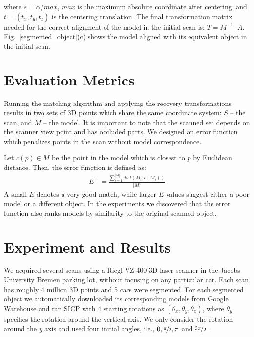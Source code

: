 \documentclass{llncs}
\begin{document}
where $s = \alpha / max$, $max$ is the maximum absolute coordinate after centering, and $t = (t_x, t_y, t_z)$ is the centering translation. The final transformation matrix needed for the correct alignment of the model in the initial scan is: $ T = M^{-1} \cdot A$. Fig.~\ref{segmented_object}(c) shows the model aligned with its equivalent object in the initial scan.
\fi

\section{Evaluation Metrics}

Running the matching algorithm and applying the recovery
transformations results in two sets of 3D points which share the same
coordinate system: $S$ -- the scan, and $M$ -- the model. It is
important to note that the scanned set depends on the scanner view
point and has occluded parts. We designed an error function which
penalizes points in the scan without model correspondence.

Let $c(p) \in M$ be the point in the model which is closest to $p$ by
Euclidean distance. Then, the error function is defined as:
%
\begin{align*}
	E &= \frac{\sum_{i=1}^{|M|} dist(M_i, c(M_i))}{|M|}
\end{align*}
%
A small $E$ denotes a very good match, while larger $E$ values suggest
either a poor model or a different object. In the experiments we
discovered that the error function also ranks models by similarity to
the original scanned object.

\section{Experiment and Results}

We acquired several scans using a Riegl VZ-400 3D laser scanner in the
Jacobs University Bremen parking lot, without focusing on any
particular car. Each scan has roughly 4 million 3D points and 5 cars
were segmented. For each segmented object we automatically downloaded
its corresponding models from Google Warehouse and ran SICP with 4
starting rotations as $(\theta_x,\theta_y,\theta_z)$, where $\theta_y$
specifies the rotation around the vertical axis. We only consider the
rotation around the $y$ axis and used four initial angles, i.e., $0,
\nicefrac{\pi}{2}, \pi$ and $\nicefrac{3\pi}{2}$. 
\end{document}
